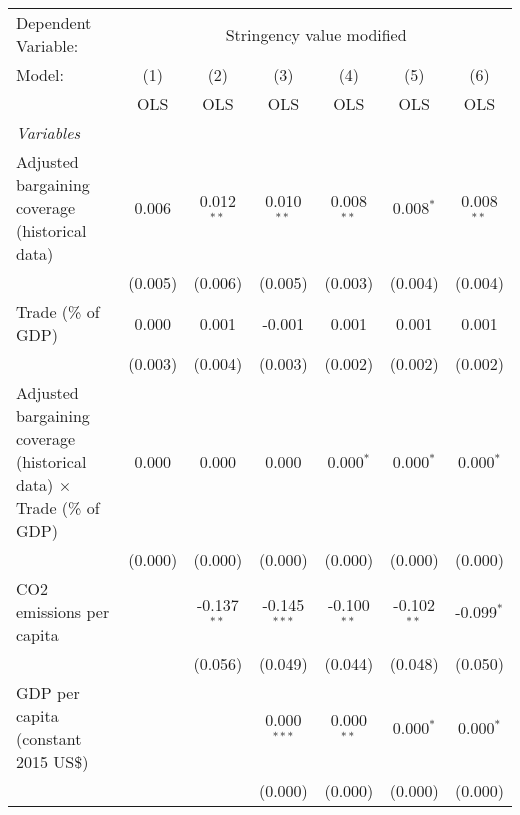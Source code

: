 
\begingroup
\centering
\begin{tabular}{lcccccc}
   \toprule
   Dependent Variable: & \multicolumn{6}{c}{Stringency value modified}\\
   Model:                                                                      & (1)     & (2)           & (3)            & (4)           & (5)           & (6)\\  
                                                                               &  OLS    & OLS           & OLS            & OLS           & OLS           & OLS\\  
   \midrule
   \emph{Variables}\\
   Adjusted bargaining coverage (historical data)                              & 0.006   & 0.012$^{**}$  & 0.010$^{**}$   & 0.008$^{**}$  & 0.008$^{*}$   & 0.008$^{**}$\\   
                                                                               & (0.005) & (0.006)       & (0.005)        & (0.003)       & (0.004)       & (0.004)\\   
   Trade (\% of GDP)                                                           & 0.000   & 0.001         & -0.001         & 0.001         & 0.001         & 0.001\\   
                                                                               & (0.003) & (0.004)       & (0.003)        & (0.002)       & (0.002)       & (0.002)\\   
   Adjusted bargaining coverage (historical data) $\times$ Trade (\% of GDP)   & 0.000   & 0.000         & 0.000          & 0.000$^{*}$   & 0.000$^{*}$   & 0.000$^{*}$\\   
                                                                               & (0.000) & (0.000)       & (0.000)        & (0.000)       & (0.000)       & (0.000)\\   
   CO2 emissions per capita                                                    &         & -0.137$^{**}$ & -0.145$^{***}$ & -0.100$^{**}$ & -0.102$^{**}$ & -0.099$^{*}$\\   
                                                                               &         & (0.056)       & (0.049)        & (0.044)       & (0.048)       & (0.050)\\   
   GDP per capita (constant 2015 US\$)                                         &         &               & 0.000$^{***}$  & 0.000$^{**}$  & 0.000$^{*}$   & 0.000$^{*}$\\   
                                                                               &         &               & (0.000)        & (0.000)       & (0.000)       & (0.000)\\   

\end{tabular}
